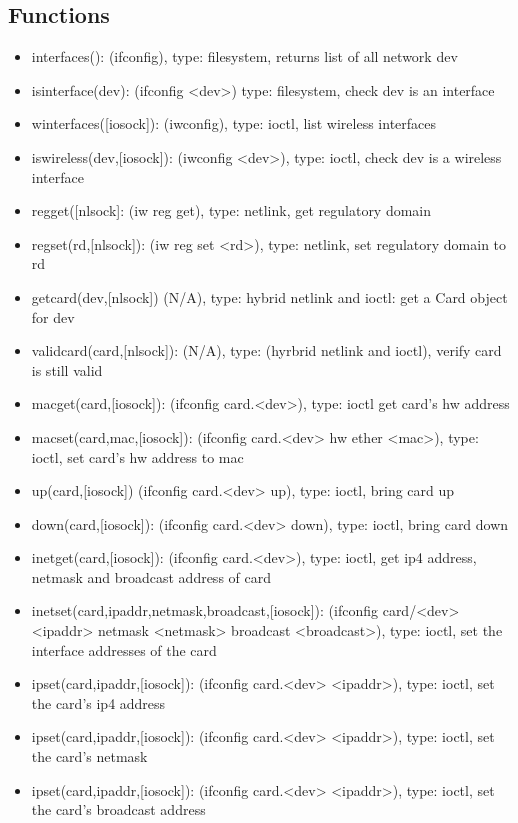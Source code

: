 \documentclass[11pt]{article}
\begin{document}
\begin{appendices}
\subsection{Functions}
\begin{itemize}
\item interfaces(): (ifconfig), type: filesystem, returns list of all network dev
\item isinterface(dev): (ifconfig <dev>) type: filesystem, check dev is an interface
\item winterfaces([iosock]): (iwconfig), type: ioctl, list wireless interfaces
\item iswireless(dev,[iosock]): (iwconfig <dev>), type: ioctl, check dev is a 
wireless interface
\item regget([nlsock]: (iw reg get), type: netlink, get regulatory domain
\item regset(rd,[nlsock]): (iw reg set <rd>), type: netlink, set regulatory domain 
to rd
\item getcard(dev,[nlsock]) (N/A), type: hybrid netlink and ioctl: get a Card 
object for dev
\item validcard(card,[nlsock]): (N/A), type: (hyrbrid netlink and ioctl), verify
card is still valid
\item macget(card,[iosock]): (ifconfig card.<dev>), type: ioctl get card's hw
address
\item macset(card,mac,[iosock]): (ifconfig card.<dev> hw ether <mac>), type: 
ioctl, set card's hw address to mac
\item up(card,[iosock]) (ifconfig card.<dev> up), type: ioctl, bring card up
\item down(card,[iosock]): (ifconfig card.<dev> down), type: ioctl, bring card 
down
\item inetget(card,[iosock]): (ifconfig card.<dev>), type: ioctl, get ip4 address,
netmask and broadcast address of card
\item inetset(card,ipaddr,netmask,broadcast,[iosock]): (ifconfig card/<dev> <ipaddr>
netmask <netmask> broadcast <broadcast>), type: ioctl, set the interface addresses
of the card
\item ipset(card,ipaddr,[iosock]): (ifconfig card.<dev> <ipaddr>), type: ioctl,
set the card's ip4 address
\item ipset(card,ipaddr,[iosock]): (ifconfig card.<dev> <ipaddr>), type: ioctl,
set the card's netmask
\item ipset(card,ipaddr,[iosock]): (ifconfig card.<dev> <ipaddr>), type: ioctl,
set the card's broadcast address

\end{itemize}
\end{appendices}
\end{document}
